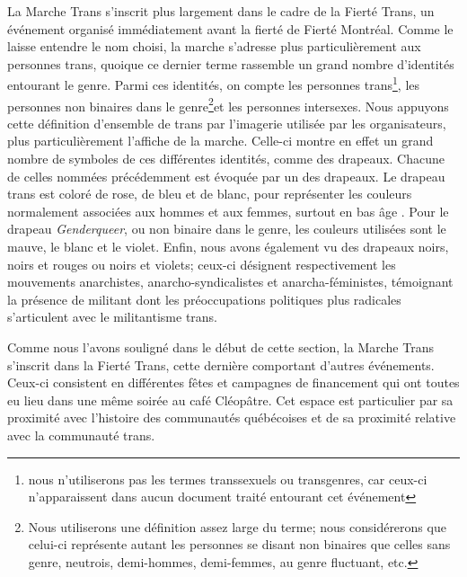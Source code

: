 La Marche Trans s'inscrit plus largement dans le cadre de la Fierté Trans, un événement organisé immédiatement avant la fierté de Fierté Montréal.
Comme le laisse entendre le nom choisi, la marche s'adresse plus particulièrement aux personnes trans, quoique ce dernier terme rassemble un grand nombre d'identités entourant le genre.
Parmi ces identités, on compte les personnes trans\footnote{nous n'utiliserons pas les termes transsexuels ou transgenres, car ceux-ci n'apparaissent dans aucun document traité entourant cet événement}, les personnes non binaires dans le genre\footnote{Nous utiliserons une définition assez large du terme; nous considérerons que celui-ci représente autant les personnes se disant non binaires que celles sans genre, neutrois, demi-hommes, demi-femmes, au genre fluctuant, etc.\citep[see][]{Barker2015}}et les personnes intersexes.
Nous appuyons cette définition d'ensemble de trans par l'imagerie utilisée par les organisateurs, plus particulièrement l'affiche de la marche.
Celle-ci montre en effet un grand nombre de symboles de ces différentes identités, comme des drapeaux.
Chacune de celles nommées précédemment est évoquée par un des drapeaux.
Le drapeau trans est coloré de rose, de bleu et de blanc, pour représenter les couleurs normalement associées aux hommes et aux femmes, surtout en bas âge \citep[quoique, selon les biens de consommation, ces couleurs sont souvent utilisées, surtout pour les produits féminins; voir][]{Koller2008}.
Pour le drapeau \emph{Genderqueer}, ou non binaire dans le genre, les couleurs utilisées sont le mauve, le blanc et le violet.
Enfin, nous avons également vu des drapeaux noirs, noirs et rouges ou noirs et violets; ceux-ci désignent respectivement les mouvements anarchistes, anarcho-syndicalistes et anarcha-féministes, témoignant la présence de militant dont les préoccupations politiques plus radicales s'articulent avec le militantisme trans.

Comme nous l'avons souligné dans le début de cette section, la Marche Trans s'inscrit dans la Fierté Trans, cette dernière comportant d'autres événements.
Ceux-ci consistent en différentes fêtes et campagnes de financement qui ont toutes eu lieu dans une même soirée au café Cléopâtre.
Cet espace est particulier par sa proximité avec l'histoire des communautés \lgbt{} québécoises et de sa proximité relative avec la communauté trans.

